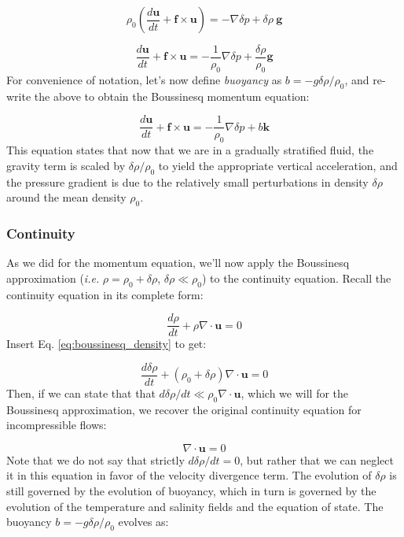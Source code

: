 \documentclass[12pt]{article}
\numberwithin{equation}{section}
\numberwithin{figure}{section}
\numberwithin{table}{section}
\begin{document}
\begin{equation}
  \rho_0 \left( \frac{d \mathbf{u}}{dt} + \mathbf{f} \times \mathbf{u} \right) =
  - \nabla \delta p + \delta \rho\ \mathbf{g}
\end{equation}

\begin{equation}
  \frac{d \mathbf{u}}{dt} + \mathbf{f} \times \mathbf{u} =
  - \frac{1}{\rho_0} \nabla \delta p + \frac{\delta \rho}{\rho_0} \mathbf{g}
\end{equation}
For convenience of notation, let's now define \textit{buoyancy}
as $b = - g \delta \rho / \rho_0$, and re-write the above to obtain the
Boussinesq momentum equation:

\begin{equation}
  \frac{d \mathbf{u}}{dt} + \mathbf{f} \times \mathbf{u} =
  - \frac{1}{\rho_0} \nabla \delta p + b \mathbf{k}
\end{equation}
This equation states that now that we are in a gradually stratified fluid,
the gravity term is scaled by $\delta \rho / \rho_0$ to yield the appropriate
vertical acceleration, and the pressure gradient is due to the relatively
small perturbations in density $\delta \rho$ around  the mean density $\rho_0$.

\subsubsection{Continuity}

As we did for the momentum equation, we'll now apply the Boussinesq approximation
(\textit{i.e.} $\rho = \rho_0 + \delta \rho$, $\delta \rho \ll \rho_0$) to the
continuity equation.
Recall the continuity equation in its complete form:

\begin{equation}
  \frac{d \rho}{dt} + \rho \nabla \cdot \mathbf{u} = 0
\end{equation}
Insert Eq. \ref{eq:boussinesq_density} to get:

\begin{equation}
  \frac{d\delta \rho}{dt} + \left( \rho_0 + \delta \rho \right) \nabla \cdot \mathbf{u} = 0
\end{equation}
Then, if we can state that that $d\delta \rho / dt \ll \rho_0 \nabla \cdot \mathbf{u}$,
which we will for the Boussinesq approximation, we recover the original
continuity equation for incompressible flows:

\begin{equation}
  \nabla \cdot \mathbf{u} = 0
\end{equation}
Note that we do not say that strictly $d \delta \rho / dt = 0$, but rather that
we can neglect it in this equation in favor of the velocity divergence term.
The evolution of $\delta \rho$ is still governed by the evolution of buoyancy,
which in turn is governed by the evolution of the temperature and salinity fields
and the equation of state.
The buoyancy $b = - g \delta \rho / \rho_0$ evolves as:
\end{document}
